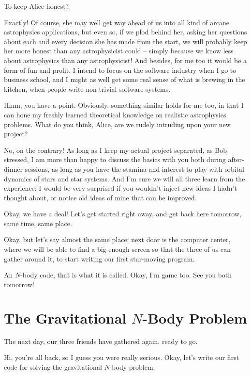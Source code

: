 \carol
To keep Alice honest?

\bob
Exactly!  Of course, she may well get way ahead of us into all
kind of arcane astrophysics applications, but even so, if we plod
behind her, asking her questions about each and every decision she has
made from the start, we will probably keep her more honest than any
astrophysicist could -- simply because we know less about astrophysics
than any astrophysicist!  And besides, for me too it would be a form of
fun and profit.  I intend to focus on the software industry when I go
to business school, and I might as well get some real sense of what is
brewing in the kitchen, when people write non-trivial software systems.

\carol
Hmm, you have a point.  Obviously, something similar holds for
me too, in that I can hone my freshly learned theoretical knowledge on
realistic astrophysics problems.  What do you think, Alice, are we
rudely intruding upon your new project?

\alice
No, on the contrary!  As long as I keep my actual project
separated, as Bob stressed, I am more than happy to discuss the basics
with you both during after-dinner sessions, as long as you have the
stamina and interest to play with orbital dynamics of stars and star
systems.  And I'm sure we will all three learn from the experience: I
would be very surprised if you wouldn't inject new ideas I hadn't
thought about, or notice old ideas of mine that can be improved.

\bob
Okay, we have a deal!  Let's get started right away, and get back
here tomorrow, same time, same place.

\carol
Okay, but let's say almost the same place: next door is the
computer center, where we will be able to find a big enough screen so
that the three of us can gather around it, to start writing our first
star-moving program.

\alice
An $N$-body code, that is what it is called.  Okay, I'm game too.
See you both tomorrow!

\cba

\section{The Gravitational $N$-Body Problem}

The next day, our three friends have gathered again, ready to go.

\abc

\alice
Hi, you're all back, so I guess you were really serious.  Okay, let's
write our first code for solving the gravitational $N$-body problem.

